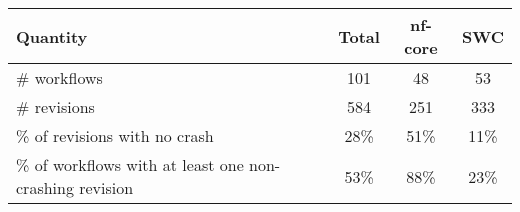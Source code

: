 \begin{tabular}{p{1.7in}ccc}
    Quantity & Total & nf-core & SWC \\
    \midrule \# workflows & 101 & 48 & 53 \\
    \# revisions & 584 & 251 & 333 \\
    \% of revisions with no crash & 28\% & 51\% & 11\% \\
    \% of workflows with at least one non-crashing revision & 53\% & 88\% & 23\%
\end{tabular}